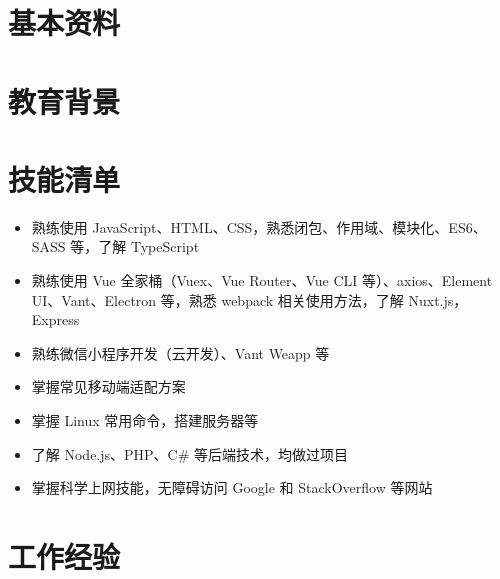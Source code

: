 \documentclass[12pt,a4paper]{moderncv}
\begin{document}
\maketitle\vspace*{0pt}

\section{\textbf {基本资料}}


\section{\textbf {教育背景}}


\section{\textbf {技能清单}}

  {
    \begin{itemize}
      \item \small 熟练使用 JavaScript、HTML、CSS，熟悉闭包、作用域、模块化、ES6、SASS 等，了解 TypeScript
      \item \small 熟练使用 Vue 全家桶（Vuex、Vue Router、Vue CLI 等）、axios、Element UI、Vant、Electron 等，熟悉 webpack 相关使用方法，了解 Nuxt.js，Express
      \item \small 熟练微信小程序开发（云开发）、Vant Weapp 等
      \item \small 掌握常见移动端适配方案
      \item \small 掌握 Linux 常用命令，搭建服务器等
      \item \small 了解 Node.js、PHP、C\# 等后端技术，均做过项目
      \item \small 掌握科学上网技能，无障碍访问 Google 和 StackOverflow 等网站
    \end{itemize}
  }

\section{\textbf {工作经验}}
\end{document}
